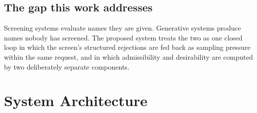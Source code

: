 \documentclass[conference]{IEEEtran}
\begin{document}
\subsection{The gap this work addresses}

Screening systems evaluate names they are given. Generative systems produce
names nobody has screened. The proposed system treats the two as one closed loop
in which the screen's structured rejections are fed back as sampling pressure
within the same request, and in which admissibility and desirability are computed
by two deliberately separate components.

\section{System Architecture}
\end{document}
